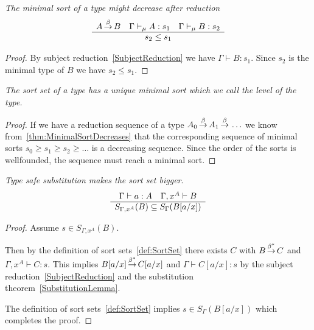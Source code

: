 \begin{theorem}
    \label{thm:MinimalSortDecreases}
    \emph{The minimal sort of a type might decrease after reduction}
    $$
    \begin{array}{c} 
        A {\,\stackrel{\beta}{\to}\,} B
        \quad \Gamma \vdash_\mu A: s_1
        \quad \Gamma \vdash_\mu B: s_2
     \\ \hline 
        s_2 \le s_1
    \end{array}
    $$

    \begin{proof}
        By subject reduction~\ref{SubjectReduction} we have $\Gamma \vdash B:
        s_1$. Since $s_2$ is the minimal type of $B$ we have $s_2 \le s_1$.
    \end{proof}

\end{theorem}




\begin{theorem}
    \emph{The sort set of a type has a unique minimal sort which we call the
    level of the type.}

    \begin{proof}
        If we have a reduction sequence of a type $A_0 {\,\stackrel{\beta}{\to}\,} A_1 {\,\stackrel{\beta}{\to}\,}
        \ldots$ we know from~\ref{thm:MinimalSortDecreases} that the
        corresponding sequence of minimal sorts $s_0 \ge s_1 \ge s_2 \ge
        \ldots$ is a decreasing sequence. Since the order of the sorts is
        wellfounded, the sequence must reach a minimal sort.
    \end{proof}
\end{theorem}


\begin{theorem}
    \label{thm:SortSetSubstitution}
    \emph{Type safe substitution makes the sort set bigger}.
    $$
        \begin{array}{c} 
            \Gamma \vdash a : A \quad \Gamma,x^A \vdash B
         \\ \hline 
            S_{\Gamma,x^A}(B) \subseteq S_\Gamma(B[a/x])
        \end{array}
    $$
    \begin{proof}
        Assume $s \in S_{\Gamma,x^A}(B)$.

        Then by the definition of sort sets~\ref{def:SortSet}
        there exists $C$ with $B {\,\stackrel{\beta^*}{\to}\,} C$ and $\Gamma,x^A \vdash C: s$.
        This implies $B[a/x] {\,\stackrel{\beta^*}{\to}\,} C[a/x]$ and $\Gamma \vdash C[a/x] : s$
        by the subject reduction~\ref{SubjectReduction} and the substitution
        theorem~\ref{SubstitutionLemma}.

        The definition of sort sets~\ref{def:SortSet} implies $s \in
        S_\Gamma(B[a/x])$ which completes the proof.
    \end{proof}
\end{theorem}






